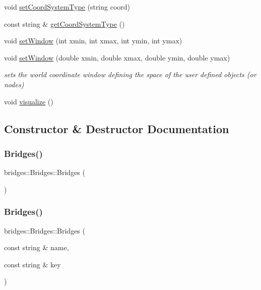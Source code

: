 \begin{DoxyCompactItemize}
void \mbox{\hyperlink{classbridges_1_1_bridges_ad00c07d3a028110424909081a94c4013}{set\+Coord\+System\+Type}} (string coord)
\item 
const string \& \mbox{\hyperlink{classbridges_1_1_bridges_aac3cdb607177ff537f5160c3790d814a}{get\+Coord\+System\+Type}} ()
\item 
void \mbox{\hyperlink{classbridges_1_1_bridges_a0465bca83056a72ba4db82b60e622163}{set\+Window}} (int xmin, int xmax, int ymin, int ymax)
\item 
void \mbox{\hyperlink{classbridges_1_1_bridges_aa0bfa955d36a85fa9ffa31a0bc6c19c4}{set\+Window}} (double xmin, double xmax, double ymin, double ymax)
\begin{DoxyCompactList}\small\item\em sets the world coordinate window defining the space of the user defined objects (or nodes) \end{DoxyCompactList}\item 
void \mbox{\hyperlink{classbridges_1_1_bridges_a2806e395134614cdd6327400b53d28ad}{visualize}} ()
\end{DoxyCompactItemize}


\subsection{Constructor \& Destructor Documentation}
\mbox{\label{classbridges_1_1_bridges_aab8b250b2b5ba0034ceb2494fe5ea437}} 
\subsubsection{\texorpdfstring{Bridges()}{Bridges()}\hspace{0.1cm}{\footnotesize\ttfamily [1/3]}}
{\footnotesize\ttfamily bridges\+::\+Bridges\+::\+Bridges (\begin{DoxyParamCaption}{ }\end{DoxyParamCaption})\hspace{0.3cm}{\ttfamily [inline]}}

\mbox{\label{classbridges_1_1_bridges_a21d9e98cb1f3994300079b489f14e71e}} 
\subsubsection{\texorpdfstring{Bridges()}{Bridges()}\hspace{0.1cm}{\footnotesize\ttfamily [2/3]}}
{\footnotesize\ttfamily bridges\+::\+Bridges\+::\+Bridges (\begin{DoxyParamCaption}\item[{const string \&}]{name,  }\item[{const string \&}]{key }\end{DoxyParamCaption})\hspace{0.3cm}{\ttfamily [inline]}}



